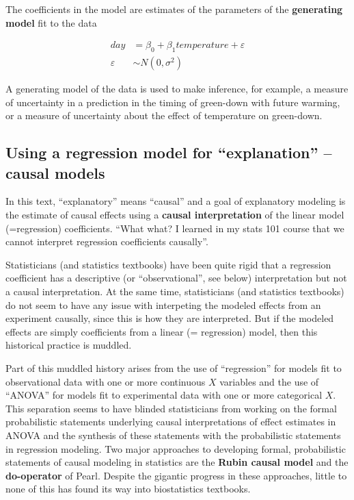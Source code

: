 \documentclass[]{book}
\begin{document}
The coefficients in the model are estimates of the parameters of the \textbf{generating model} fit to the data

\begin{align}
day &= \beta_0 + \beta_1 temperature + \varepsilon\\
\varepsilon &\sim N(0, \sigma^2)
\label{eq:continuous-x-m1}
\end{align}

A generating model of the data is used to make inference, for example, a measure of uncertainty in a prediction in the timing of green-down with future warming, or a measure of uncertainty about the effect of temperature on green-down.

\hypertarget{using-a-regression-model-for-explanation-causal-models}{%
\subsection{Using a regression model for ``explanation'' -- causal models}\label{using-a-regression-model-for-explanation-causal-models}}

In this text, ``explanatory'' means ``causal'' and a goal of explanatory modeling is the estimate of causal effects using a \textbf{causal interpretation} of the linear model (=regression) coefficients. ``What what? I learned in my stats 101 course that we cannot interpret regression coefficients causally''.

Statisticians (and statistics textbooks) have been quite rigid that a regression coefficient has a descriptive (or ``observational'', see below) interpretation but not a causal interpretation. At the same time, statisticians (and statistics textbooks) do not seem to have any issue with interpeting the modeled effects from an experiment causally, since this is how they are interpreted. But if the modeled effects are simply coefficients from a linear (= regression) model, then this historical practice is muddled.

Part of this muddled history arises from the use of ``regression'' for models fit to observational data with one or more continuous \(X\) variables and the use of ``ANOVA'' for models fit to experimental data with one or more categorical \(X\). This separation seems to have blinded statisticians from working on the formal probabilistic statements underlying causal interpretations of effect estimates in ANOVA and the synthesis of these statements with the probabilistic statements in regression modeling. Two major approaches to developing formal, probabilistic statements of causal modeling in statistics are the \textbf{Rubin causal model} and the \textbf{do-operator} of Pearl. Despite the gigantic progress in these approaches, little to none of this has found its way into biostatistics textbooks.
\end{document}
